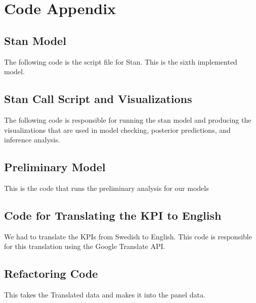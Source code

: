 \documentclass[10pt,a4paper, hidelinks]{article} %
\begin{document}
\endgroup

\newpage
\section{Code Appendix}

\subsection{Stan Model}
The following code is the script file for Stan. This is the sixth implemented model.

\subsection{Stan Call Script and Visualizations}
The following code is responsible for running the stan model and producing the visualizations that are used in model checking, posterior predictions, and inference analysis. 


\subsection{Preliminary Model}
This is the code that runs the preliminary analysis for our models


\subsection{Code for Translating the KPI to English}
We had to translate the KPIs from Swedish to English. This code is responsible for this translation using the Google Translate API.


\subsection{Refactoring Code}
This takes the Translated data and makes it into the panel data.

\end{document}
